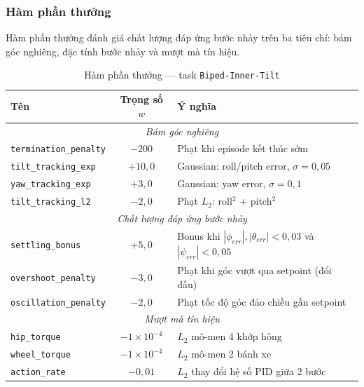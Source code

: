 \subsubsection{Hàm phần thưởng}

Hàm phần thưởng đánh giá chất lượng đáp ứng bước nhảy trên ba tiêu chí:
bám góc nghiêng, đặc tính bước nhảy và mượt mà tín hiệu.

\begin{table}[H]
    \centering
    \caption{Hàm phần thưởng — task \texttt{Biped-Inner-Tilt}}
    \label{tab:rewards_inner}
    \renewcommand{\arraystretch}{1.3}
    \begin{tabular}{|l|c|p{7cm}|}
    \hline
    \textbf{Tên} & \textbf{Trọng số $w$} & \textbf{Ý nghĩa} \\
    \hline
    \multicolumn{3}{|c|}{\textit{Bám góc nghiêng}} \\
    \hline
    \texttt{termination\_penalty} & $-200$            & Phạt khi episode kết thúc sớm \\
    \texttt{tilt\_tracking\_exp}  & $+10{,}0$         & Gaussian: roll/pitch error, $\sigma=0{,}05$ \\
    \texttt{yaw\_tracking\_exp}   & $+3{,}0$          & Gaussian: yaw error, $\sigma=0{,}1$ \\
    \texttt{tilt\_tracking\_l2}   & $-2{,}0$          & Phạt $L_2$: roll$^2$ + pitch$^2$ \\
    \hline
    \multicolumn{3}{|c|}{\textit{Chất lượng đáp ứng bước nhảy}} \\
    \hline
    \texttt{settling\_bonus}      & $+5{,}0$          & Bonus khi $|\phi_{err}|,|\theta_{err}|<0{,}03$ và $|\psi_{err}|<0{,}05$ \\
    \texttt{overshoot\_penalty}   & $-3{,}0$          & Phạt khi góc vượt qua setpoint (đổi dấu) \\
    \texttt{oscillation\_penalty} & $-2{,}0$          & Phạt tốc độ góc đảo chiều gần setpoint \\
    \hline
    \multicolumn{3}{|c|}{\textit{Mượt mà tín hiệu}} \\
    \hline
    \texttt{hip\_torque}   & $-1\times10^{-4}$ & $L_2$ mô-men 4 khớp hông \\
    \texttt{wheel\_torque} & $-1\times10^{-4}$ & $L_2$ mô-men 2 bánh xe \\
    \texttt{action\_rate}  & $-0{,}01$         & $L_2$ thay đổi hệ số PID giữa 2 bước \\
    \hline
    \end{tabular}
\end{table}

